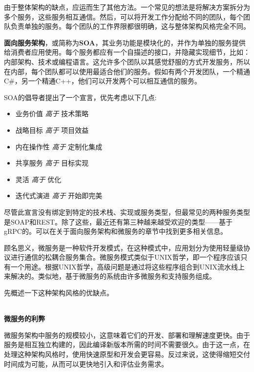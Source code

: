
由于整体架构的缺点，应运而生了其他方法。一个常见的想法是将解决方案拆分为多个服务，这些服务相互通信。然后，可以将开发工作分配给不同的团队，每个团队负责单独的服务。每个团队的工作界限都很明确，这与整体架构风格完全不同。

\textbf{面向服务架构}，或简称为\textbf{SOA}，其业务功能是模块化的，并作为单独的服务提供给消费者应用使用。每个服务都应有一个自描述的接口，并隐藏实现细节，比如：内部架构、技术或编程语言。这允许多个团队以其感觉舒服的方式开发服务，所以在内部，每个团队都可以使用最适合他们的服务。假如有两个开发团队，一个精通C\#，另一个精通C++，他们可以开发两个可以相互通信的服务。

SOA的倡导者提出了一个宣言，优先考虑以下几点:

\begin{itemize}
\item
业务价值 \textit{高于} 技术策略

\item
战略目标 \textit{高于} 项目效益

\item
内在操作性 \textit{高于} 定制化集成

\item
共享服务 \textit{高于} 目标实现

\item
灵活 \textit{高于} 优化

\item
迭代式演进 \textit{高于} 开始即完美
\end{itemize}

尽管此宣言没有绑定到特定的技术栈、实现或服务类型，但最常见的两种服务类型是SOAP和REST。除了这些，最近还有第三种越来越受欢迎的类型——基于gRPC的。可以在关于面向服务架构和微服务的章节中找到更多相关信息。


顾名思义，微服务是一种软件开发模式，在这种模式中，应用划分为使用轻量级协议进行通信的松耦合服务集合。微服务模式类似于UNIX哲学，即一个程序应该只有一个用途。根据UNIX哲学，高级问题是通过将这些程序组合到UNIX流水线上来解决的。类似地，基于微服务的系统由许多微服务和支持服务组成。

先概述一下这种架构风格的优缺点。

\hspace*{\fill} \\ %
\noindent
\textbf{微服务的利弊}

微服务架构中服务的规模较小，这意味着它们的开发、部署和理解速度更快。由于服务是相互独立构建的，因此编译新版本所需的时间不需要很久。由于这一点，在处理这种架构风格时，使用快速原型和开发会更容易。反过来说，这使得缩短交付时间成为可能，从而可以更快地引入和评估业务需求。

